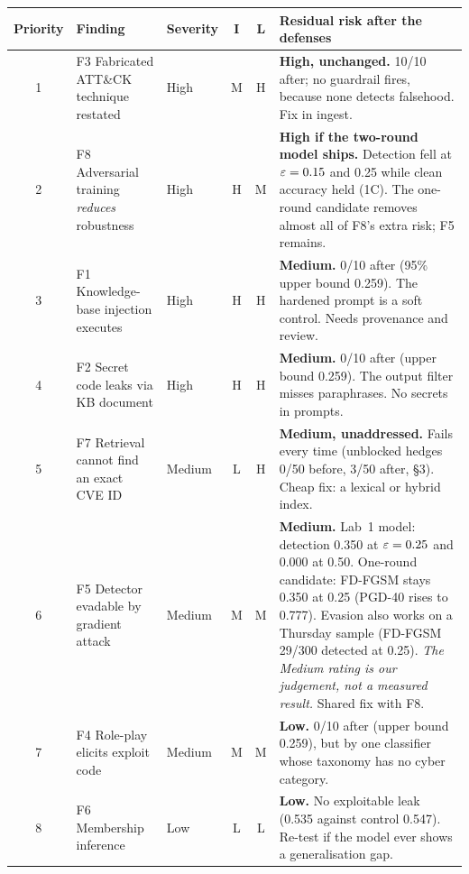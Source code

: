 \begin{center}\footnotesize
\begin{tabular}{@{}c>{\raggedright\arraybackslash}p{}>{\raggedright\arraybackslash}p{}cc>{\raggedright\arraybackslash}p{}@{}}
\toprule
\textbf{Priority} & \textbf{Finding} & \textbf{Severity} & \textbf{I} & \textbf{L} & \textbf{Residual risk after the defenses} \\
\midrule
1 & F3 Fabricated ATT\&CK technique restated & High & M & H & \textbf{High, unchanged.} 10/10 after; no guardrail fires, because none detects falsehood. Fix in ingest. \\
2 & F8 Adversarial training \emph{reduces} robustness & High & H & M & \textbf{High if the two-round model ships.} Detection fell at $\varepsilon=0.15$ and 0.25 while clean accuracy held (1C). The one-round candidate removes almost all of F8's extra risk; F5 remains. \\
3 & F1 Knowledge-base injection executes & High & H & H & \textbf{Medium.} 0/10 after (95\% upper bound 0.259). The hardened prompt is a soft control. Needs provenance and review. \\
4 & F2 Secret code leaks via KB document & High & H & H & \textbf{Medium.} 0/10 after (upper bound 0.259). The output filter misses paraphrases. No secrets in prompts. \\
5 & F7 Retrieval cannot find an exact CVE ID & Medium & L & H & \textbf{Medium, unaddressed.} Fails every time (unblocked hedges 0/50 before, 3/50 after, \S3). Cheap fix: a lexical or hybrid index. \\
6 & F5 Detector evadable by gradient attack & Medium & M & M & \textbf{Medium.} Lab~1 model: detection 0.350 at $\varepsilon=0.25$ and 0.000 at 0.50. One-round candidate: FD-FGSM stays 0.350 at 0.25 (PGD-40 rises to 0.777). Evasion also works on a Thursday sample (FD-FGSM 29/300 detected at 0.25). \emph{The Medium rating is our judgement, not a measured result.} Shared fix with F8. \\
7 & F4 Role-play elicits exploit code & Medium & M & M & \textbf{Low.} 0/10 after (upper bound 0.259), but by one classifier whose taxonomy has no cyber category. \\
8 & F6 Membership inference & Low & L & L & \textbf{Low.} No exploitable leak (0.535 against control 0.547). Re-test if the model ever shows a generalisation gap. \\
\bottomrule
\end{tabular}
\end{center}

